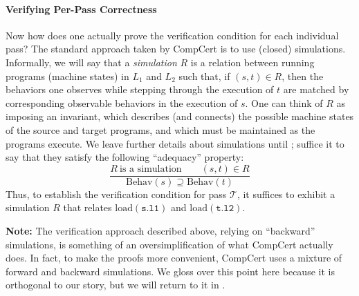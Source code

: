 


\paragraph{Verifying Per-Pass Correctness}

Now how does one actually prove the verification condition for each individual pass?  The standard
approach taken by CompCert is to use (closed) simulations.  Informally, we will say that a
\emph{simulation} $R$ is a relation between running programs (\ie machine states) in $L_1$ and $L_2$
such that, if $(s,t) \in R$, then the behaviors one observes while stepping through the execution of
$t$ are matched by corresponding observable behaviors in the execution of $s$.  One can think of $R$
as imposing an invariant, which describes (and connects) the possible machine states of the source
and target programs, and which must be maintained as the programs execute.  We leave further details
about simulations until ; suffice it to say that they satisfy the
following ``adequacy'' property:
\[
\frac{
R~\mbox{is a simulation} \qquad
(s,t)\in R
}{
\mathrm{Behav}(s) \supseteq \mathrm{Behav}(t)
}
\]
Thus, to establish the verification condition for pass $\mathcal{T}$, it suffices to exhibit a
simulation $R$ that relates $\mathrm{load}(\mathtt{s.l1})$ and $\mathrm{load}(\mathtt{t.l2})$.

\textbf{Note:} The verification approach described above, relying on ``backward'' simulations, is
something of an oversimplification of what CompCert actually does.  In fact, to make the proofs more
convenient, CompCert uses a mixture of forward and backward simulations.  We gloss over this point
here because it is orthogonal to our story, but we will return to it in .



